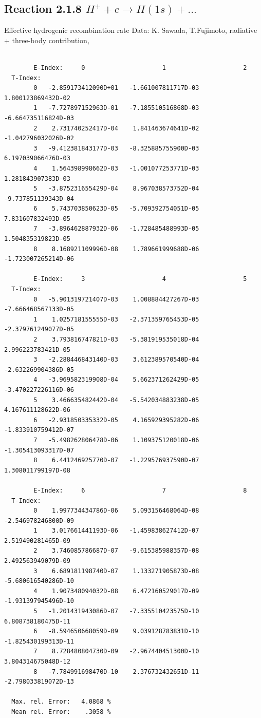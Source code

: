 \documentclass[12pt,dvips]{article}
\begin{document}
\subsection{
  Reaction 2.1.8 $ H^+ + e \rightarrow H(1s) + ...$
}

   Effective hydrogenic recombination rate
   Data: K. Sawada, T.Fujimoto, radiative + three-body contribution, \cite{kn:Sawada}


\begin{small}\begin{verbatim}

        E-Index:     0                     1                     2
  T-Index:
        0   -2.859173412090D+01   -1.661007811717D-03    1.800123869432D-02
        1   -7.727897152963D-01   -7.185510516868D-03   -6.664735116824D-03
        2    2.731740252417D-04    1.841463674641D-02   -1.042796032026D-02
        3   -9.412381843177D-03   -8.325885755900D-03    6.197039066476D-03
        4    1.564398998662D-03   -1.001077253771D-03    1.281843907383D-03
        5   -3.875231655429D-04    8.967038573752D-04   -9.737851139343D-04
        6    5.743703850623D-05   -5.709392754051D-05    7.831607832493D-05
        7   -3.896462887932D-06   -1.728485488993D-05    1.504835319823D-05
        8    8.168921109996D-08    1.789661999688D-06   -1.723007265214D-06

        E-Index:     3                     4                     5
  T-Index:
        0   -5.901319721407D-03    1.008884427267D-03   -7.666468567133D-05
        1    1.025718155555D-03   -2.371359765453D-05   -2.379761249077D-05
        2    3.793816747821D-03   -5.381919535018D-04    2.996223783421D-05
        3   -2.288446843140D-03    3.612389570540D-04   -2.632269904386D-05
        4   -3.969582319908D-04    5.662371262429D-05   -3.470227226116D-06
        5    3.466635482442D-04   -5.542034883238D-05    4.167611128622D-06
        6   -2.931850335332D-05    4.165929395282D-06   -1.833910759412D-07
        7   -5.498262806478D-06    1.109375120018D-06   -1.305413093317D-07
        8    6.441246925770D-07   -1.229576937590D-07    1.308011799197D-08

        E-Index:     6                     7                     8
  T-Index:
        0    1.997734434786D-06    5.093156468064D-08   -2.546978246800D-09
        1    3.017661441193D-06   -1.459838627412D-07    2.519490281465D-09
        2    3.746085786687D-07   -9.615385988357D-08    2.492563949079D-09
        3    6.689181198740D-07    1.133271905873D-08   -5.680616540286D-10
        4    1.907348094032D-08    6.472160529017D-09   -1.931397945496D-10
        5   -1.201431943086D-07   -7.335510423575D-10    6.808738180475D-11
        6   -8.594650668059D-09    9.039128783831D-10   -1.825430199313D-11
        7    8.728480804730D-09   -2.967440451300D-10    3.804314675048D-12
        8   -7.784991698470D-10    2.376732432651D-11   -2.798033819072D-13

  Max. rel. Error:   4.0868 %
  Mean rel. Error:    .3058 %

\end{verbatim}\end{small}
\end{document}
